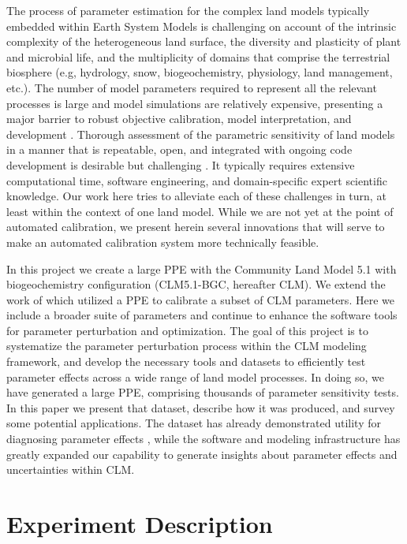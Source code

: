 \documentclass[draft]{agujournal2019}
\begin{document}
The process of parameter estimation for the complex land models typically embedded within Earth System Models is challenging on account of the intrinsic complexity of the heterogeneous land surface, the diversity and plasticity of plant and microbial life, and the multiplicity of domains that comprise the terrestrial biosphere (e.g, hydrology, snow, biogeochemistry, physiology, land management, etc.). The number of model parameters required to represent all the relevant processes is large and model simulations are relatively expensive, presenting a major barrier to robust objective calibration, model interpretation, and development \cite{fisher2020,dagon2020}.
Thorough assessment of the parametric sensitivity of land models in a manner that is repeatable, open, and integrated with ongoing code development is desirable but challenging \cite{hourdin2017,balaji2022}. It typically requires extensive computational time,  software engineering, and domain-specific expert scientific knowledge. Our work here tries to alleviate each of these challenges in turn, at least within the context of one land model. While we are not yet at the point of automated calibration, we present herein several innovations that will serve to make an automated calibration system more technically feasible.

In this project we create a large PPE with the Community Land Model 5.1 with biogeochemistry configuration (CLM5.1-BGC, hereafter CLM)\cite{lawrence2019}. We extend the work of  which utilized a PPE to calibrate a subset of CLM parameters. Here we include a broader suite of parameters and continue to enhance the software tools for parameter perturbation and optimization. The goal of this project is to systematize the parameter perturbation process within the CLM modeling framework, and develop the necessary tools and datasets to efficiently test parameter effects across a wide range of land model processes. In doing so, we have generated a large PPE, comprising thousands of parameter sensitivity tests.
In this paper we present that dataset, describe how it was produced, and survey some potential applications.
The dataset has already demonstrated utility for diagnosing parameter effects \cite{cheng2023,yan2023a,yan2023b,zarakas2024}, while the software and modeling infrastructure has greatly expanded our capability to generate insights about parameter effects and uncertainties within CLM.




\section{Experiment Description}
\label{methods}
\end{document}
